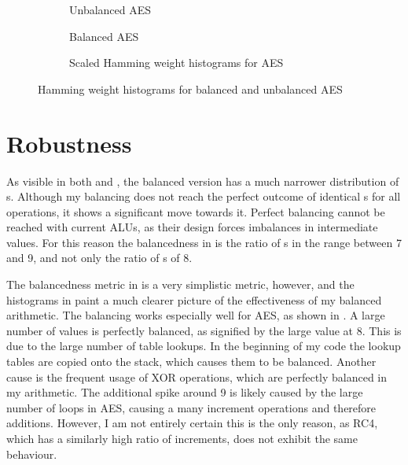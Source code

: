 \begin{figure}[hp]
  \centering
  \begin{subfigure}[b]{0.49\textwidth}
    
    \caption{Unbalanced AES}
  \end{subfigure}
  \begin{subfigure}[b]{0.49\textwidth}
    
    \caption{Balanced AES}
    \label{fig:aes-balanced}
  \end{subfigure}

  \begin{subfigure}[b]{\textwidth}
    
    \caption{Scaled Hamming weight histograms for AES}
    \label{fig:aes-comp}
  \end{subfigure}
  \caption{Hamming weight histograms for balanced and unbalanced AES}
  \label{fig:aes}
\end{figure}

\section{Robustness}
As visible in both  and , the balanced version has a much narrower distribution of \hammingw{}s.
Although my balancing does not reach the perfect outcome of identical \hammingw{}s for all operations, it shows a significant move towards it.
Perfect balancing cannot be reached with current ALUs, as their design forces imbalances in intermediate values.
For this reason the balancedness in  is the ratio of \hammingw{}s in the range between 7 and 9, and not only the ratio of \hammingw{}s of 8.

The balancedness metric in  is a very simplistic metric, however, and the histograms in  paint a much clearer picture of the effectiveness of my balanced arithmetic.
The balancing works especially well for AES, as shown in .
A large number of values is perfectly balanced, as signified by the large value at 8.
This is due to the large number of table lookups.
In the beginning of my code the lookup tables are copied onto the stack, which causes them to be balanced.
Another cause is the frequent usage of XOR operations, which are perfectly balanced in my arithmetic.
The additional spike around 9 is likely caused by the large number of loops in AES, causing a many increment operations and therefore additions.
However, I am not entirely certain this is the only reason, as RC4, which has a similarly high ratio of increments, does not exhibit the same behaviour.

